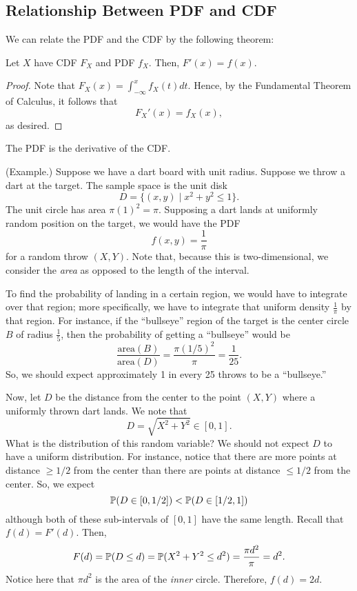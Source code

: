 \subsection{Relationship Between PDF and CDF}
We can relate the PDF and the CDF by the following theorem: 
\begin{theorem}{}{}
    Let $X$ have CDF $F_{X}$ and PDF $f_{X}$. Then, $F'(x) = f(x)$.
\end{theorem}

\begin{proof}
    Note that $F_{X}(x) = \int_{-\infty}^x f_{X}(t) dt$. Hence, by the Fundamental Theorem of Calculus, it follows that 
    \[F_{X}'(x) = f_{X}(x),\]
    as desired.
\end{proof}

\begin{note}{}{}
    The PDF is the derivative of the CDF. 
\end{note}

\begin{mdframed}[]
    (Example.) Suppose we have a dart board with unit radius. Suppose we throw a dart at the target. The sample space is the unit disk 
    \[D = \{(x, y) \mid x^2 + y^2 \leq 1\}.\]
    The unit circle has area $\pi(1)^2 = \pi$. Supposing a dart lands at uniformly random position on the target, we would have the PDF 
    \[f(x, y) = \frac{1}{\pi}\]
    for a random throw $(X, Y)$. Note that, because this is two-dimensional, we consider the \emph{area} as opposed to the length of the interval. 

    \bigskip 

    To find the probability of landing in a certain region, we would have to integrate over that region; more specifically, we have to integrate that uniform density $\frac{1}{\pi}$ by that region. For instance, if the ``bullseye'' region of the target is the center circle $B$ of radius $\frac{1}{5}$, then the probability of getting a ``bullseye'' would be 
    \[\frac{\text{area}(B)}{\text{area}(D)} = \frac{\pi(1 / 5)^2}{\pi} = \frac{1}{25}.\]
    So, we should expect approximately 1 in every 25 throws to be a ``bullseye.''

    \bigskip 

    Now, let $D$ be the distance from the center to the point $(X, Y)$ where a uniformly thrown dart lands. We note that 
    \[D = \sqrt{X^2 + Y^2} \in [0, 1].\]
    What is the distribution of this random variable? We should not expect $D$ to have a uniform distribution. For instance, notice that there are more points at distance $\geq 1/2$ from the center than there are points at distance $\leq 1/2$ from the center. So, we expect 
    \[\mathbb{P}(D \in [0, 1/2]) < \mathbb{P}(D \in [1/2, 1])\]
    although both of these sub-intervals of $[0, 1]$ have the same length. Recall that $f(d) = F'(d)$. Then, 
    \[F(d) = \mathbb{P}(D \leq d) = \mathbb{P}(X^2 + Y^2 \leq d^2) = \frac{\pi d^2}{\pi} = d^2.\]
    Notice here that $\pi d^2$ is the area of the \emph{inner} circle. Therefore, $f(d) = 2d$. 
\end{mdframed}

